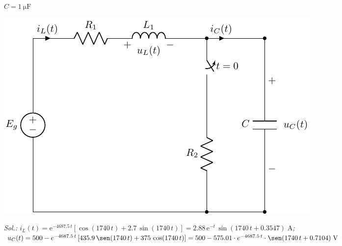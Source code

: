 \begin{enumerate}
\begin{minipage}{0.3\linewidth}
  $C = \SI{1}{\micro\farad}$%
\end{minipage}
\begin{minipage}{0.7\linewidth}
  \includegraphics{../figs/E1_RLC.pdf}
\end{minipage}

\emph{Sol.:\;\;
  $i_L(t)=
  \mathrm{e}^{-4687.5\,t}\left[\cos(1740\,t)+2.7\,\sin(1740\,t)\right]=2.88\,\mathrm{e}^{-t}\,\sin\left(1740\,t+0.3547\right)\;\unit{\ampere}$;\;\;
  $u_C(t) = 500 - e^{-4687.5 \,t} \left[435.9\, \sen(1740 \,t) + 375\, \cos(1740 \,t)\right] = 500 - 575.01 \cdot e^{-4687.5 \,t} \cdot  \sen(1740 \,t + 0.7104)\;\unit{\volt}$
  }

\end{enumerate}
